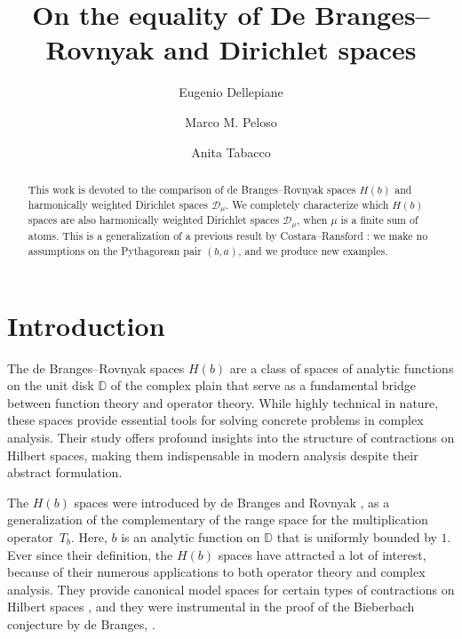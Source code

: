 \documentclass[12pt]{amsart}
\title[De Branges--Rovnyak and Dirichlet spaces]{On the equality of De
  Branges--Rovnyak and Dirichlet spaces}
\author[E.\ Dellepiane]{Eugenio Dellepiane}
\author[M.\ M.\ Peloso]{Marco M. Peloso}
\author[A.\ Tabacco]{Anita Tabacco}
\date{}
\theoremstyle{definition}
\theoremstyle{remark}
\theoremstyle{remark}
\begin{document}
\begin{abstract}
 This work is devoted to the comparison of de Branges--Rovnyak spaces $H(b)$ and harmonically weighted Dirichlet spaces $\mathcal{D}_\mu$. We completely characterize which $H(b)$ spaces are also harmonically
weighted Dirichlet spaces $\mathcal{D}_\mu$, when  $\mu$ is a finite sum of atoms. This is a generalization of a previous result by
Costara--Ransford \cite{costara2013}: we make no assumptions on the Pythagorean pair $(b,a)$, and we produce new examples.
\end{abstract}
\maketitle
\section{Introduction}
The de Branges--Rovnyak spaces $H(b)$ are a class of spaces of analytic functions on the unit disk $\mathbb{D}$ of the complex plain that serve as a fundamental bridge between
function theory and operator theory. While highly technical in nature, these spaces provide essential tools for solving concrete problems in complex analysis. Their study offers profound insights into the structure of contractions on Hilbert spaces, making them indispensable in modern analysis despite their abstract formulation.

The $H(b)$ spaces were introduced by de Branges and Rovnyak \cite{Debrangesrovnyak}, as a generalization of the complementary of the range space for the multiplication operator~$T_b$. Here, $b$ is an
analytic function on $\mathbb{D}$ that is uniformly bounded by $1$. Ever since their definition, the $H(b)$ spaces have attracted a lot of interest, because of their numerous applications to both operator theory and complex analysis. They provide canonical model
spaces for certain types of contractions on Hilbert spaces \cite{nagyfoias,Timotin}, and they were instrumental in the  proof of the Bieberbach conjecture  by de Branges, \cite{bieberbachdebranges}. 
\end{document}
